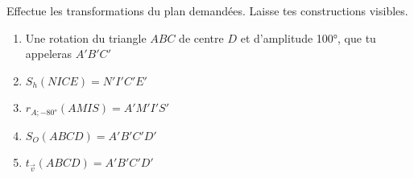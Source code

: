 \documentclass[parskip=half-,twoside=semi, 12pt]{scrartcl}
\begin{document}
\begin{appliquer}[points=10]
    Effectue les transformations du plan demandées. Laisse tes constructions visibles.
    \begin{enumerate}
        \item Une rotation du triangle \(ABC\) de centre \(D\) et d'amplitude \ang{100}, que tu appeleras \(A'B'C'\)
              \begin{center}
                  
              \end{center}
        \item \(S_{h}(NICE) = N'I'C'E'\)
              \begin{center}
                  
              \end{center}
        \item \(r_{A;\ang{-80}}(AMIS) = A'M'I'S'\)
              \begin{center}
                  
              \end{center}
              \newpage
        \item \(S_{O}(ABCD)=A'B'C'D'\)
              \begin{center}
                  
              \end{center}
        \item \(t_{\overrightarrow{v}}(ABCD)=A'B'C'D'\)
              \begin{center}
                  
              \end{center}
    \end{enumerate}
\end{appliquer}
\end{document}
